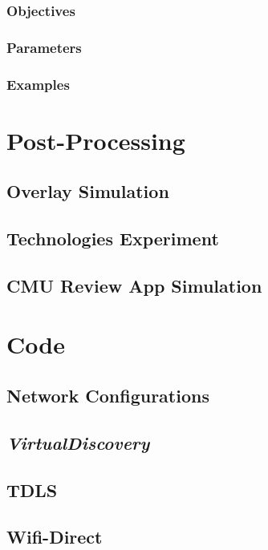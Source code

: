 \documentclass[a4paper]{book}
\begin{document}
\subsection{Objectives}


\subsection{Parameters}

\subsection{Examples}

\chapter{Post-Processing}

\section{Overlay Simulation}

\section{Technologies Experiment}

\section{CMU Review App Simulation}

\chapter{Code}

\section{Network Configurations}


\section{\textit{VirtualDiscovery}}


\section{TDLS}

\section{Wifi-Direct}
\end{document}
